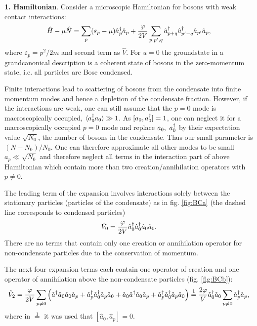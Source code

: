 
\textbf{1. Hamiltonian}. 
Consider a microscopic Hamiltonian for bosons with weak contact interactions:
\begin{equation}
	\hat{H} - \mu \hat{N} = \sum_p (\varepsilon_p - \mu) \hat{a}_p^{\dag} \hat{a}_p + \frac{\varphi}{2V} \sum_{p, p', q} \hat{a}^{\dag}_{p+q} \hat{a}^{\dag}_{p'-q} \hat{a}_{p'} \hat{a}_p,
	\label{BECbase}
\end{equation}
where $\varepsilon_p = p^2 / 2m$ and second term as $\hat{V}$.  For $u = 0$ the groundstate in a grandcanonical description is a coherent
state of bosons in the zero-momentum state, i.e. all particles are Bose condensed. 

Finite interactions lead to scattering of bosons from the condensate into finite momentum modes
and hence a depletion of the condensate fraction. However, if the interactions are weak,
one can still assume that the $p = 0$ mode is macroscopically occupied, $\langle a_0^{\dag} a_0\rangle \gg 1$. As $[a_0, a_0^{\dag}]=1$, one can neglect it for a macroscopically occupied $p = 0$ mode and replace $a_0,\ a_0^{\dag}$ by their expectation value $\sqrt{N_0}$, the number of bosons in the condensate. Thus our small parameter is $(N-N_0)/N_0$. One can therefore approximate all other modes to be small $a_p \ll \sqrt{N_0}$ and  therefore neglect all terms in the interaction part of above Hamiltonian which contain more than two creation/annihilation operators with $p \neq 0$. 



The leading term of the expansion involves interactions solely between the stationary particles (particles of the condensate) as in fig. \ref{fig:BCa} (the dashed line corresponds to condensed particles)
\begin{equation*}
	\hat{V}_0 = \frac{\varphi}{2V} \hat{a}^{\dag}_0 \hat{a}^{\dag}_0 \hat{a}_0 \hat{a}_0.
\end{equation*}
There are no terms that contain only one creation or annihilation operator for non-condensate particles due to the conservation of momentum.



The next four expansion terms each contain one operator of creation and one operator of annihilation above the non-condensate particles (fig. \ref{fig:BCb}):
\begin{equation*}
	\hat{V}_2 = \frac{\varphi}{2V}  \sum_{p \neq 0} \left(
		\hat{a}^{\dag} \hat{a}_0 \hat{a}_0 \hat{a}_p + 
		\hat{a}_p^{\dag} \hat{a}_0^{\dag} \hat{a}_p \hat{a}_0 + 
		\hat{a}_0 \hat{a}^{\dag} \hat{a}_0 \hat{a}_p + 
		\hat{a}_p^{\dag} \hat{a}_0^{\dag} \hat{a}_p \hat{a}_0
	\right) \overset{1}{=}  \frac{2\varphi}{V} \hat{a}^{\dag}_0 \hat{a}_0 \sum_{p \neq 0} \hat{a}_p^{\dag} \hat{a}_p,
\end{equation*}
where in $ \overset{1}{=} $ it was used that $[\hat{a}_0, \hat{a}_p] = 0$. 



